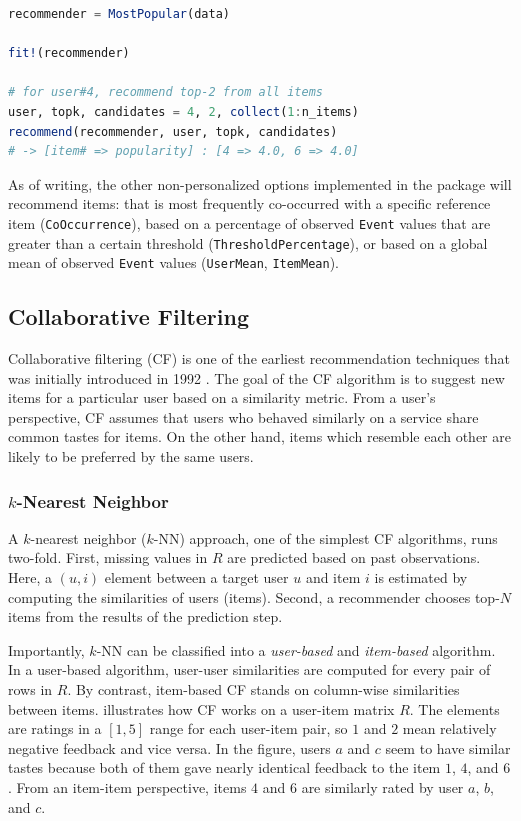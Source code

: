 \begin{lstlisting}[language = Julia]
recommender = MostPopular(data)

fit!(recommender)

# for user#4, recommend top-2 from all items
user, topk, candidates = 4, 2, collect(1:n_items)
recommend(recommender, user, topk, candidates)
# -> [item# => popularity] : [4 => 4.0, 6 => 4.0]
\end{lstlisting}

As of writing, the other non-personalized options implemented in the package will recommend items: that is most frequently co-occurred with a specific reference item (\texttt{CoOccurrence}), based on a percentage of observed \texttt{Event} values that are greater than a certain threshold (\texttt{ThresholdPercentage}), or based on a global mean of observed \texttt{Event} values (\texttt{UserMean}, \texttt{ItemMean}).

\subsection{Collaborative Filtering}
\label{sec:cf}

Collaborative filtering (CF) is one of the earliest recommendation techniques that was initially introduced in 1992 \cite{Goldberg1992}. The goal of the CF algorithm is to suggest new items for a particular user based on a similarity metric. From a user's perspective, CF assumes that users who behaved similarly on a service share common tastes for items. On the other hand, items which resemble each other are likely to be preferred by the same users.

\subsubsection{$k$-Nearest Neighbor}

A $k$-nearest neighbor ($k$-NN) approach, one of the simplest CF algorithms, runs two-fold. First, missing values in $R$ are predicted based on past observations. Here, a $(u, i)$ element between a target user $u$ and item $i$ is estimated by computing the similarities of users (items). Second, a recommender chooses top-$N$ items from the results of the prediction step.

Importantly, $k$-NN can be classified into a \textit{user-based} and \textit{item-based} algorithm. In a user-based algorithm, user-user similarities are computed for every pair of rows in $R$. By contrast, item-based CF stands on column-wise similarities between items.  illustrates how CF works on a user-item matrix $R$. The elements are ratings in a $[1, 5]$ range for each user-item pair, so $1$ and $2$ mean relatively negative feedback and vice versa. In the figure, users $a$ and $c$ seem to have similar tastes because both of them gave nearly identical feedback to the item $1$, $4$, and $6$. From an item-item perspective, items $4$ and $6$ are similarly rated by user $a$, $b$, and $c$.


